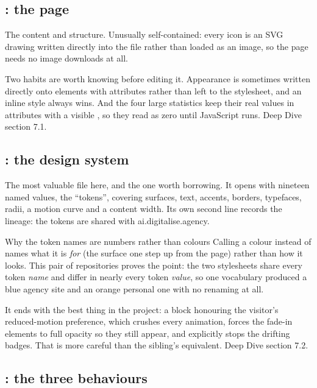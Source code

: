 \documentclass[11pt,a4paper]{article}
\begin{document}
\subsection{: the page}

The content and structure. Unusually self-contained: every icon is an SVG drawing
written directly into the file rather than loaded as an image, so the page needs no
image downloads at all.

Two habits are worth knowing before editing it. Appearance is sometimes written
directly onto elements with  attributes rather than left to the
stylesheet, and an inline style always wins. And the four large statistics keep
their real values in  attributes with a visible , so they read
as zero until JavaScript runs. Deep Dive section 7.1.

\subsection{: the design system}

The most valuable file here, and the one worth borrowing. It opens with nineteen
named values, the ``tokens'', covering surfaces, text, accents, borders, typefaces,
radii, a motion curve and a content width. Its own second line records the lineage:
the tokens are shared with ai.digitalise.agency.

\begin{keyidea}{Why the token names are numbers rather than colours}
Calling a colour  instead of  names what it is
\emph{for} (the surface one step up from the page) rather than how it looks. This
pair of repositories proves the point: the two stylesheets share every token
\emph{name} and differ in nearly every token \emph{value}, so one vocabulary
produced a blue agency site and an orange personal one with no renaming at all.
\end{keyidea}

It ends with the best thing in the project: a block honouring the visitor's
reduced-motion preference, which crushes every animation, forces the fade-in
elements to full opacity so they still appear, and explicitly stops the drifting
badges. That is more careful than the sibling's equivalent. Deep Dive section 7.2.

\subsection{: the three behaviours}
\end{document}
